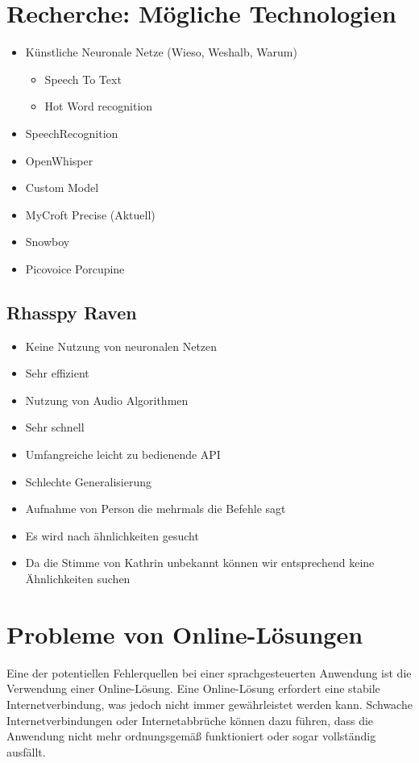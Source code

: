\section{Recherche: Mögliche Technologien}

\begin{itemize}
    \item Künstliche Neuronale Netze (Wieso, Weshalb, Warum)
    \begin{itemize}
        \item Speech To Text
        \item Hot Word recognition
    \end{itemize}
    \item SpeechRecognition
    \item OpenWhisper
    \item Custom Model
    \item MyCroft Precise (Aktuell)
    \item Snowboy
    \item Picovoice Porcupine
\end{itemize}

\subsection{Rhasspy Raven}

\begin{itemize}
    \item Keine Nutzung von neuronalen Netzen
    \item Sehr effizient
    \item Nutzung von Audio Algorithmen
    \item Sehr schnell
    \item Umfangreiche leicht zu bedienende API
    \item Schlechte Generalisierung
    \item Aufnahme von Person die mehrmals die Befehle sagt
    \item Es wird nach ähnlichkeiten gesucht
    \item Da die Stimme von Kathrin unbekannt können wir entsprechend keine Ähnlichkeiten suchen
\end{itemize}

\section{Probleme von Online-Lösungen}

Eine der potentiellen Fehlerquellen bei einer sprachgesteuerten Anwendung ist die Verwendung einer Online-Lösung. Eine Online-Lösung erfordert eine stabile Internetverbindung, was jedoch nicht immer gewährleistet werden kann. Schwache Internetverbindungen oder Internetabbrüche können dazu führen, dass die Anwendung nicht mehr ordnungsgemäß funktioniert oder sogar vollständig ausfällt.

